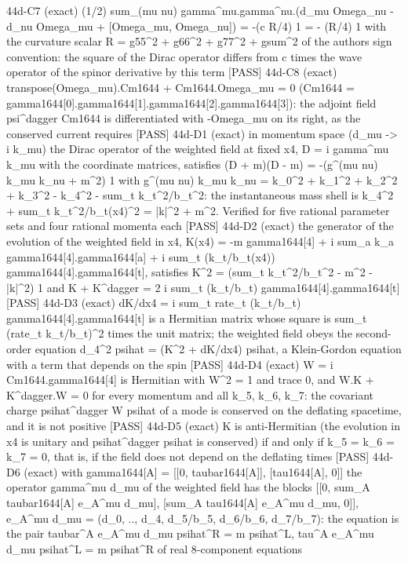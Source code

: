 \documentclass[
  10pt,
]{article}
\newenvironment{Shaded}{}{}
\newcommand{\NormalTok}[1]{#1}
\begin{document}
\begin{Shaded}
\begin{Highlighting}[]
\NormalTok{[PASS] 44d{-}C7  (exact) (1/2) sum\_(mu nu) gamma\^{}mu.gamma\^{}nu.(d\_mu Omega\_nu {-} d\_nu Omega\_mu + [Omega\_mu, Omega\_nu]) = {-}(c R/4) 1 = {-} (R/4) 1 with the curvature scalar R = g55\^{}2 + g66\^{}2 + g77\^{}2 + gsum\^{}2 of the author\textquotesingle{}s sign convention: the square of the Dirac operator differs from c times the wave operator of the spinor derivative by this term}
\NormalTok{[PASS] 44d{-}C8  (exact) transpose(Omega\_mu).Cm1644 + Cm1644.Omega\_mu = 0 (Cm1644 = gamma1644[0].gamma1644[1].gamma1644[2].gamma1644[3]): the adjoint field psi\^{}dagger Cm1644 is differentiated with {-}Omega\_mu on its right, as the conserved current requires}
\NormalTok{[PASS] 44d{-}D1  (exact) in momentum space (d\_mu {-}\textgreater{} i k\_mu) the Dirac operator of the weighted field at fixed x4, D = i gamma\^{}mu k\_mu with the coordinate matrices, satisfies (D + m)(D {-} m) = {-}(g\^{}(mu nu) k\_mu k\_nu + m\^{}2) 1 with g\^{}(mu nu) k\_mu k\_nu = k\_0\^{}2 + k\_1\^{}2 + k\_2\^{}2 + k\_3\^{}2 {-} k\_4\^{}2 {-} sum\_t k\_t\^{}2/b\_t\^{}2: the instantaneous mass shell is k\_4\^{}2 + sum\_t k\_t\^{}2/b\_t(x4)\^{}2 = |k|\^{}2 + m\^{}2. Verified for five rational parameter sets and four rational momenta each}
\NormalTok{[PASS] 44d{-}D2  (exact) the generator of the evolution of the weighted field in x4, K(x4) = {-}m gamma1644[4] + i sum\_a k\_a gamma1644[4].gamma1644[a] + i sum\_t (k\_t/b\_t(x4)) gamma1644[4].gamma1644[t], satisfies K\^{}2 = (sum\_t k\_t\^{}2/b\_t\^{}2 {-} m\^{}2 {-} |k|\^{}2) 1 and K + K\^{}dagger = 2 i sum\_t (k\_t/b\_t) gamma1644[4].gamma1644[t]}
\NormalTok{[PASS] 44d{-}D3  (exact) dK/dx4 = i sum\_t rate\_t (k\_t/b\_t) gamma1644[4].gamma1644[t] is a Hermitian matrix whose square is sum\_t (rate\_t k\_t/b\_t)\^{}2 times the unit matrix; the weighted field obeys the second{-}order equation d\_4\^{}2 psihat = (K\^{}2 + dK/dx4) psihat, a Klein{-}Gordon equation with a term that depends on the spin}
\NormalTok{[PASS] 44d{-}D4  (exact) W = i Cm1644.gamma1644[4] is Hermitian with W\^{}2 = 1 and trace 0, and W.K + K\^{}dagger.W = 0 for every momentum and all k\_5, k\_6, k\_7: the covariant charge psihat\^{}dagger W psihat of a mode is conserved on the deflating spacetime, and it is not positive}
\NormalTok{[PASS] 44d{-}D5  (exact) K is anti{-}Hermitian (the evolution in x4 is unitary and psihat\^{}dagger psihat is conserved) if and only if k\_5 = k\_6 = k\_7 = 0, that is, if the field does not depend on the deflating times}
\NormalTok{[PASS] 44d{-}D6  (exact) with gamma1644[A] = [[0, taubar1644[A]], [tau1644[A], 0]] the operator gamma\^{}mu d\_mu of the weighted field has the blocks [[0, sum\_A taubar1644[A] e\_A\^{}mu d\_mu], [sum\_A tau1644[A] e\_A\^{}mu d\_mu, 0]], e\_A\^{}mu d\_mu = (d\_0, .., d\_4, d\_5/b\_5, d\_6/b\_6, d\_7/b\_7): the equation is the pair taubar\^{}A e\_A\^{}mu d\_mu psihat\^{}R = m psihat\^{}L, tau\^{}A e\_A\^{}mu d\_mu psihat\^{}L = m psihat\^{}R of real 8{-}component equations}

\end{Highlighting}
\end{Shaded}
\end{document}

